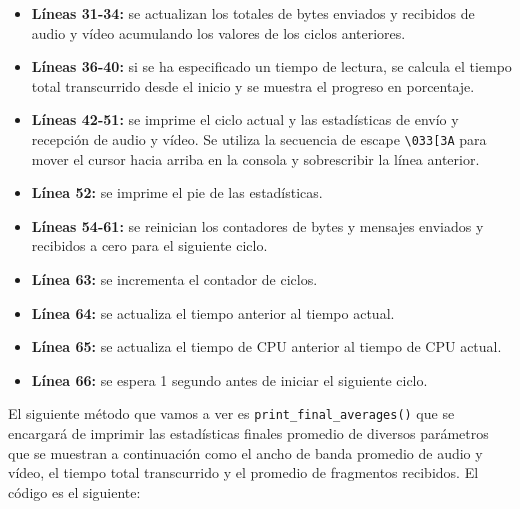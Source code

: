 \begin{itemize}
    \item \textbf{Líneas 31-34:} se actualizan los totales de bytes enviados y recibidos de audio y vídeo acumulando los valores de los ciclos anteriores.
    \item \textbf{Líneas 36-40:} si se ha especificado un tiempo de lectura, se calcula el tiempo total transcurrido desde el inicio y se muestra el progreso en porcentaje.
    \item \textbf{Líneas 42-51:} se imprime el ciclo actual y las estadísticas de envío y recepción de audio y vídeo. Se utiliza la secuencia de escape \texttt{\textbackslash 033[3A} para mover el cursor hacia arriba en la consola y sobrescribir la línea anterior.
    \item \textbf{Línea 52:} se imprime el pie de las estadísticas.
    \item \textbf{Líneas 54-61:} se reinician los contadores de bytes y mensajes enviados y recibidos a cero para el siguiente ciclo.
    \item \textbf{Línea 63:} se incrementa el contador de ciclos.
    \item \textbf{Línea 64:} se actualiza el tiempo anterior al tiempo actual.
    \item \textbf{Línea 65:} se actualiza el tiempo de CPU anterior al tiempo de CPU actual.
    \item \textbf{Línea 66:} se espera 1 segundo antes de iniciar el siguiente ciclo.
\end{itemize}
\vspace{\baselineskip}

El siguiente método que vamos a ver es \texttt{print\_final\_averages()} que se encargará de imprimir las estadísticas finales promedio de diversos parámetros que se muestran a continuación como el ancho de banda promedio de audio y vídeo, el tiempo total transcurrido y el promedio de fragmentos recibidos. El código es el siguiente:

